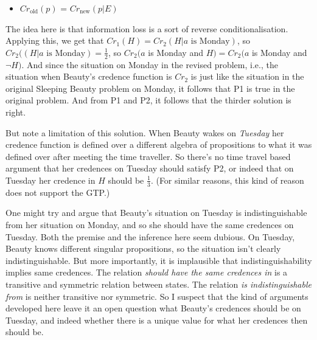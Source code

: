 \begin{itemize}
\item \(Cr_{\text{old}}(p)\) = \(Cr_{\text{new}}(p | E)\)
\end{itemize}

\noindent The idea here is that information loss is a sort of reverse conditionalisation. Applying this, we get that \(Cr_1(H) = Cr_2(H | a \text{ is Monday})\), so \(Cr_2((H | a \text{ is Monday}) = \frac{1}{2}\), so \(Cr_2(a\) is Monday and \(H) = Cr_2(a\) is Monday and \(\neg H)\). And since the situation on Monday in the revised problem, i.e., the situation when Beauty's credence function is \(Cr_2\) is just like the situation in the original Sleeping Beauty problem on Monday, it follows that P1 is true in the original problem. And from P1 and P2, it follows that the thirder solution is right.

But note a limitation of this solution. When Beauty wakes on \textit{Tuesday} her credence function is defined over a different algebra of propositions to what it was defined over after meeting the time traveller. So there's no time travel based argument that her credences on Tuesday should satisfy P2, or indeed that on Tuesday her credence in \(H\) should be \(\frac{1}{3}\). (For similar reasons, this kind of reason does not support the GTP.)

One might try and argue that Beauty's situation on Tuesday is indistinguishable from her situation on Monday, and so she should have the same credences on Tuesday. Both the premise and the inference here seem dubious. On Tuesday, Beauty knows different singular propositions, so the situation isn't clearly indistinguishable. But more importantly, it is implausible that indistinguishability implies same credences. The relation \textit{should have the same credences in} is a transitive and symmetric relation between states. The relation \textit{is indistinguishable from} is neither transitive nor symmetric. So I suspect that the kind of arguments developed here leave it an open question what Beauty's credences should be on Tuesday, and indeed whether there is a unique value for what her credences then should be.
